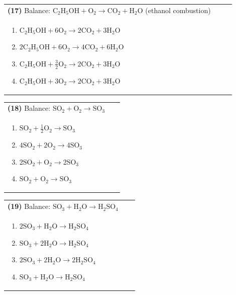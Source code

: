 \documentclass{article}
\begin{document}
{\vspace{0.2cm}
\noindent \begin{tabular}{|p{0.9\linewidth}|}
\hline
\vspace{0.2cm}
\textbf{(17)} Balance: \(\mathrm{C_2H_5OH + O_2 \rightarrow CO_2 + H_2O}\) (ethanol combustion)\\
\begin{minipage}[t]{0.85\linewidth}
\begin{enumerate}[label=\alph*.]
   \item \(\mathrm{C_2H_5OH + 6O_2 \rightarrow 2CO_2 + 3H_2O}\)
   \item \(\mathrm{2C_2H_5OH + 6O_2 \rightarrow 4CO_2 + 6H_2O}\)
   \item \(\mathrm{C_2H_5OH + \tfrac{3}{2}O_2 \rightarrow 2CO_2 + 3H_2O}\)
   \item \(\mathrm{C_2H_5OH + 3O_2 \rightarrow 2CO_2 + 3H_2O}\)
\end{enumerate}
\end{minipage}\\
\hline
\end{tabular}

\vspace{0.2cm}
\noindent \begin{tabular}{|p{0.9\linewidth}|}
\hline
\vspace{0.2cm}
\textbf{(18)} Balance: \(\mathrm{SO_2 + O_2 \rightarrow SO_3}\)\\
\begin{minipage}[t]{0.85\linewidth}
\begin{enumerate}[label=\alph*.]
   \item \(\mathrm{SO_2 + \tfrac{1}{2}O_2 \rightarrow SO_3}\)
   \item \(\mathrm{4SO_2 + 2O_2 \rightarrow 4SO_3}\)
   \item \(\mathrm{2SO_2 + O_2 \rightarrow 2SO_3}\)
   \item \(\mathrm{SO_2 + O_2 \rightarrow SO_3}\)
\end{enumerate}
\end{minipage}\\
\hline
\end{tabular}

\vspace{0.2cm}
\noindent \begin{tabular}{|p{0.9\linewidth}|}
\hline
\vspace{0.2cm}
\textbf{(19)} Balance: \(\mathrm{SO_3 + H_2O \rightarrow H_2SO_4}\)\\
\begin{minipage}[t]{0.85\linewidth}
\begin{enumerate}[label=\alph*.]
   \item \(\mathrm{2SO_3 + H_2O \rightarrow H_2SO_4}\)
   \item \(\mathrm{SO_3 + 2H_2O \rightarrow H_2SO_4}\)
   \item \(\mathrm{2SO_3 + 2H_2O \rightarrow 2H_2SO_4}\)
   \item \(\mathrm{SO_3 + H_2O \rightarrow H_2SO_4}\)
\end{enumerate}
\end{minipage}\\
\hline
\end{tabular}

}
\end{document}
